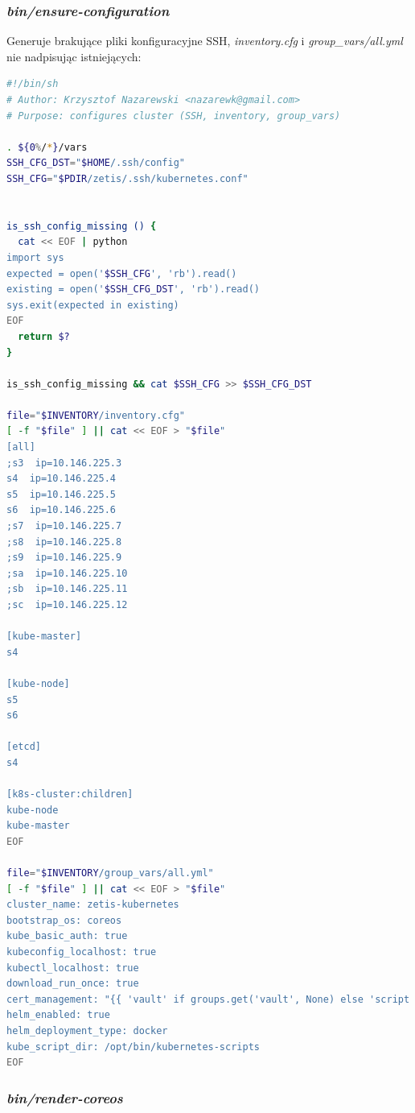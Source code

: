 \documentclass[a4paper,12pt,twoside,openany]{report}
\begin{document}
\newpage

\hypertarget{binensure-configuration}{%
\subsubsection{\texorpdfstring{\emph{bin/ensure-configuration}}{bin/ensure-configuration}}\label{binensure-configuration}}

Generuje brakujące pliki konfiguracyjne SSH, \emph{inventory.cfg} i
\emph{group\_vars/all.yml} nie nadpisując istniejących:

\begin{lstlisting}[language=bash]
#!/bin/sh
# Author: Krzysztof Nazarewski <nazarewk@gmail.com>
# Purpose: configures cluster (SSH, inventory, group_vars)

. ${0%/*}/vars
SSH_CFG_DST="$HOME/.ssh/config"
SSH_CFG="$PDIR/zetis/.ssh/kubernetes.conf"


is_ssh_config_missing () {
  cat << EOF | python
import sys
expected = open('$SSH_CFG', 'rb').read()
existing = open('$SSH_CFG_DST', 'rb').read()
sys.exit(expected in existing)
EOF
  return $?
}

is_ssh_config_missing && cat $SSH_CFG >> $SSH_CFG_DST

file="$INVENTORY/inventory.cfg"
[ -f "$file" ] || cat << EOF > "$file"
[all]
;s3  ip=10.146.225.3
s4  ip=10.146.225.4
s5  ip=10.146.225.5
s6  ip=10.146.225.6
;s7  ip=10.146.225.7
;s8  ip=10.146.225.8
;s9  ip=10.146.225.9
;sa  ip=10.146.225.10
;sb  ip=10.146.225.11
;sc  ip=10.146.225.12

[kube-master]
s4

[kube-node]
s5
s6

[etcd]
s4

[k8s-cluster:children]
kube-node
kube-master
EOF

file="$INVENTORY/group_vars/all.yml"
[ -f "$file" ] || cat << EOF > "$file"
cluster_name: zetis-kubernetes
bootstrap_os: coreos
kube_basic_auth: true
kubeconfig_localhost: true
kubectl_localhost: true
download_run_once: true
cert_management: "{{ 'vault' if groups.get('vault', None) else 'script' }}"
helm_enabled: true
helm_deployment_type: docker
kube_script_dir: /opt/bin/kubernetes-scripts
EOF
\end{lstlisting}

\newpage

\hypertarget{binrender-coreos}{%
\subsubsection{\texorpdfstring{\emph{bin/render-coreos}}{bin/render-coreos}}\label{binrender-coreos}}
\end{document}
